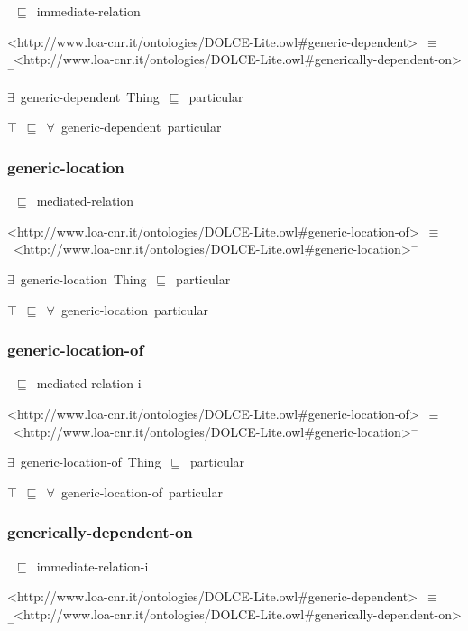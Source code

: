 \documentclass{article}
\begin{document}
~\ensuremath{\sqsubseteq}~immediate-relation

<http://www.loa-cnr.it/ontologies/DOLCE-Lite.owl#generic-dependent>~\ensuremath{\equiv}~<http://www.loa-cnr.it/ontologies/DOLCE-Lite.owl#generically-dependent-on>\ensuremath{^-}

\ensuremath{\exists}~generic-dependent~Thing~\ensuremath{\sqsubseteq}~particular

\ensuremath{\top}~\ensuremath{\sqsubseteq}~\ensuremath{\forall}~generic-dependent~particular

\subsubsection*{generic-location}

~\ensuremath{\sqsubseteq}~mediated-relation

<http://www.loa-cnr.it/ontologies/DOLCE-Lite.owl#generic-location-of>~\ensuremath{\equiv}~<http://www.loa-cnr.it/ontologies/DOLCE-Lite.owl#generic-location>\ensuremath{^-}

\ensuremath{\exists}~generic-location~Thing~\ensuremath{\sqsubseteq}~particular

\ensuremath{\top}~\ensuremath{\sqsubseteq}~\ensuremath{\forall}~generic-location~particular

\subsubsection*{generic-location-of}

~\ensuremath{\sqsubseteq}~mediated-relation-i

<http://www.loa-cnr.it/ontologies/DOLCE-Lite.owl#generic-location-of>~\ensuremath{\equiv}~<http://www.loa-cnr.it/ontologies/DOLCE-Lite.owl#generic-location>\ensuremath{^-}

\ensuremath{\exists}~generic-location-of~Thing~\ensuremath{\sqsubseteq}~particular

\ensuremath{\top}~\ensuremath{\sqsubseteq}~\ensuremath{\forall}~generic-location-of~particular

\subsubsection*{generically-dependent-on}

~\ensuremath{\sqsubseteq}~immediate-relation-i

<http://www.loa-cnr.it/ontologies/DOLCE-Lite.owl#generic-dependent>~\ensuremath{\equiv}~<http://www.loa-cnr.it/ontologies/DOLCE-Lite.owl#generically-dependent-on>\ensuremath{^-}
\end{document}
